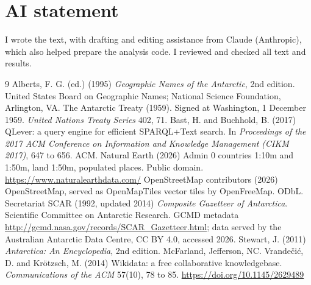 \documentclass[11pt,a4paper]{article}
\begin{document}
\section*{AI statement}
I wrote the text, with drafting and editing assistance from Claude (Anthropic), which also helped prepare the analysis code. I reviewed and checked all text and results.

\begin{thebibliography}{9}
 Alberts, F. G. (ed.) (1995) \textit{Geographic Names of the Antarctic}, 2nd edition. United States Board on Geographic Names; National Science Foundation, Arlington, VA.
 The Antarctic Treaty (1959). Signed at Washington, 1 December 1959. \textit{United Nations Treaty Series} 402, 71.
 Bast, H. and Buchhold, B. (2017) QLever: a query engine for efficient SPARQL+Text search. In \textit{Proceedings of the 2017 ACM Conference on Information and Knowledge Management (CIKM 2017)}, 647 to 656. ACM.
 Natural Earth (2026) Admin 0 countries 1:10m and 1:50m, land 1:50m, populated places. Public domain. \url{https://www.naturalearthdata.com/}
 OpenStreetMap contributors (2026) OpenStreetMap, served as OpenMapTiles vector tiles by OpenFreeMap. ODbL.
 Secretariat SCAR (1992, updated 2014) \textit{Composite Gazetteer of Antarctica}. Scientific Committee on Antarctic Research. GCMD metadata \url{http://gcmd.nasa.gov/records/SCAR_Gazetteer.html}; data served by the Australian Antarctic Data Centre, CC BY 4.0, accessed 2026.
 Stewart, J. (2011) \textit{Antarctica: An Encyclopedia}, 2nd edition. McFarland, Jefferson, NC.
 Vrande\v{c}i\'c, D. and Kr\"otzsch, M. (2014) Wikidata: a free collaborative knowledgebase. \textit{Communications of the ACM} 57(10), 78 to 85. \url{https://doi.org/10.1145/2629489}
\end{thebibliography}
\end{document}
